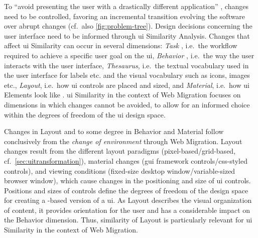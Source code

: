 To ``avoid presenting the user with a drastically different application'' \autocite{Distante2006a}, changes need to be controlled, favoring an incremental transition evolving the software over abrupt changes (cf.~also \cref{fig:problem-tree}).
Design decisions concerning the user interface need to be informed through \gls{ui} Similarity Analysis.
Changes that affect \gls{ui} Similarity can occur in several dimensions: \emph{Task} \autocite{Bakaev2017WebIntelligence,Stroulia2002}, i.e.~the workflow required to achieve a specific user goal on the \gls{ui}, \emph{Behavior} \autocite{Stroulia2002}, i.e.~the way the user interacts with the user interface, \emph{Thesaurus}, i.e.~the textual vocabulary used in the user interface for labels etc.
and the visual vocabulary such as icons, images etc., \emph{Layout}, i.e.~how \gls{ui} controls are placed and sized, and \emph{Material}, i.e.~how \gls{ui} Elements look like \autocite{Bakaev2017Kansei}.
\gls{ui} Similarity in the context of \gls{Web Migration} focuses on dimensions in which changes cannot be avoided, to allow for an informed choice within the degrees of freedom of the \gls{ui} design space. 

Changes in Layout and to some degree in Behavior and Material follow conclusively from the \emph{change of environment} through \gls{Web Migration}.
Layout changes result from the different layout paradigms (pixel-based/grid-based, cf.~\cref{sec:uitransformation}), material changes (\gls{gui} framework  controls/\gls{css}-styled controls), and viewing conditions (fixed-size desktop window/variable-sized browser window), which cause changes in the positioning and size of \gls{ui} controls.
Positions and sizes of controls define the degrees of freedom of the design space for creating a -based version of a  \gls{ui}.
As Layout describes the visual organization of content, it provides orientation for the user and has a considerable impact on the Behavior dimension.
Thus, similarity of Layout is particularly relevant for \gls{ui} Similarity in the context of \gls{Web Migration}. %

